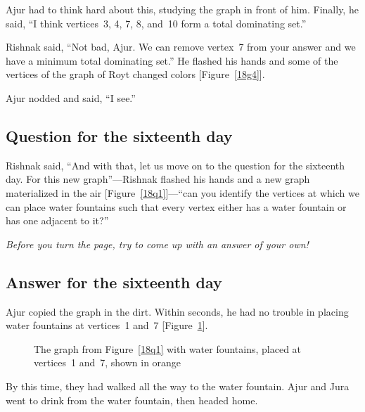 Ajur had to think hard about this, studying the graph in front of him. Finally, he said, ``I think vertices~3, 4, 7, 8, and~10 form a total dominating set.''

Rishnak said, ``Not bad, Ajur. We can remove vertex~7 from your answer and we have a minimum total dominating set.'' He flashed his hands and some of the vertices of the graph of Royt changed colors [Figure~\ref{18g4}].

Ajur nodded and said, ``I see.''

\newpage
\subsection*{Question for the sixteenth day}
Rishnak said, ``And with that, let us move on to the question for the sixteenth day. For this new graph''---Rishnak flashed his hands and a new graph materialized in the air [Figure~\ref{18q1}]---``can you identify the vertices at which we can place water fountains such that every vertex either has a water fountain or has one adjacent to it?''

\textit{Before you turn the page, try to come up with an answer of your own!}

\newpage
\subsection*{Answer for the sixteenth day}
Ajur copied the graph in the dirt. Within seconds, he had no trouble in placing water fountains at vertices~1 and~7 [Figure~\ref{18qa1}].

\begin{figure}
\begin{center}

\caption{The graph from Figure~\ref{18q1} with water fountains, placed at vertices~1 and~7, shown in orange}\label{18qa1}
\end{center}
\end{figure}

By this time, they had walked all the way to the water fountain. Ajur and Jura went to drink from the water fountain, then headed home.
